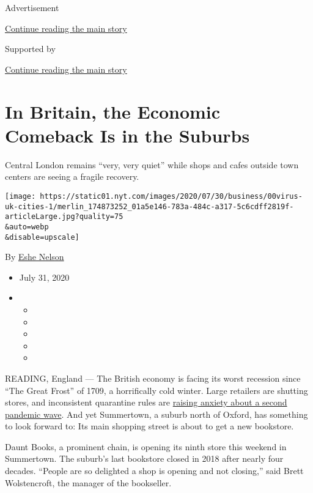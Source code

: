 Advertisement

\protect\hyperlink{after-top}{Continue reading the main story}

Supported by

\protect\hyperlink{after-sponsor}{Continue reading the main story}

\hypertarget{in-britain-the-economic-comeback-is-in-the-suburbs}{%
\section{In Britain, the Economic Comeback Is in the
Suburbs}\label{in-britain-the-economic-comeback-is-in-the-suburbs}}

Central London remains ``very, very quiet'' while shops and cafes
outside town centers are seeing a fragile recovery.

\texttt{[image: https://static01.nyt.com/images/2020/07/30/business/00virus-uk-cities-1/merlin\_174873252\_01a5e146-783a-484c-a317-5c6cdff2819f-articleLarge.jpg?quality=75\\\&auto=webp\\\&disable=upscale]}

By \href{https://www.nytimes.com/by/eshe-nelson}{Eshe Nelson}

\begin{itemize}
\item
  July 31, 2020
\item
  \begin{itemize}
  \item
  \item
  \item
  \item
  \item
  \end{itemize}
\end{itemize}

READING, England --- The British economy is facing its worst recession
since ``The Great Frost'' of 1709, a horrifically cold winter. Large
retailers are shutting stores, and inconsistent quarantine rules are
\href{https://www.nytimes.com/2020/07/30/world/europe/UK-deaths-coronavirus-europe.html}{raising
anxiety about a second pandemic wave}. And yet Summertown, a suburb
north of Oxford, has something to look forward to: Its main shopping
street is about to get a new bookstore.

Daunt Books, a prominent chain, is opening its ninth store this weekend
in Summertown. The suburb's last bookstore closed in 2018 after nearly
four decades. ``People are so delighted a shop is opening and not
closing,'' said Brett Wolstencroft, the manager of the bookseller.

